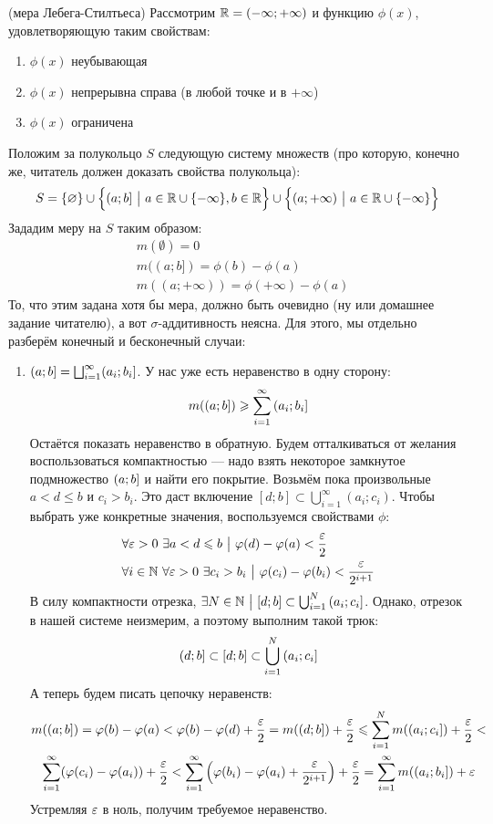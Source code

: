\begin{example} (мера Лебега-Стилтьеса)
	Рассмотрим $\mathbb{R} = (-\infty; +\infty)$ и функцию $\phi(x)$, удовлетворяющую таким свойствам:
	\begin{enumerate}
		\item $\phi(x)$ неубывающая
		
		\item $\phi(x)$ непрерывна справа (в любой точке и в $+\infty$)
		
		\item $\phi(x)$ ограничена
	\end{enumerate}
	Положим за полукольцо $S$ следующую систему множеств (про которую, конечно же, читатель должен доказать свойства полукольца):
	\[
		S = \{\varnothing\} \cup \Big\{(a; b] \ \big|\  a \in \mathbb{R} \cup \{-\infty\}, b \in \mathbb{R}\Big\} \cup \Big\{(a; +\infty) \ \big|\  a \in \mathbb{R} \cup \{-\infty\}\Big\}
	\]
	Зададим меру на $S$ таким образом:
	\begin{align*}
		&{m(\emptyset) = 0}
		\\
		&{m((a; b]) = \phi(b) - \phi(a)}
		\\
		&{m((a; +\infty)) = \phi(+\infty) - \phi(a)}
	\end{align*}
	То, что этим задана хотя бы мера, должно быть очевидно (ну или домашнее задание читателю), а вот $\sigma$-аддитивность неясна. Для этого, мы отдельно разберём конечный и бесконечный случаи:
	\begin{enumerate}
		\item $(a; b] = \bigsqcup_{i = 1}^\infty (a_i; b_i]$. У нас уже есть неравенство в одну сторону:
		\[
			m(\left(a; b\right]) \geqslant \sum_{i = 1}^\infty \left(a_i; b_i\right]
		\]
		Остаётся показать неравенство в обратную. Будем отталкиваться от желания воспользоваться компактностью --- надо взять некоторое замкнутое подмножество $\left(a; b\right]$ и найти его покрытие. Возьмём пока произвольные $a < d \le b$ и $c_i > b_i$. Это даст включение $[d; b] \subset \bigcup_{i = 1}^\infty (a_i; c_i)$. Чтобы выбрать уже конкретные значения, воспользуемся свойствами $\phi$:
		\begin{align*}
			&{\forall \varepsilon > 0\ \exists a < d \leqslant b \ \big|\  \varphi(d) - \varphi(a) < \frac{\varepsilon}{2}}
			\\
			&{\forall i \in \mathbb{N}\ \forall \varepsilon > 0\ \exists c_i > b_i \ \big|\  \varphi(c_i) - \varphi(b_i) < \frac{\varepsilon}{2^{i + 1}}}
		\end{align*}
		В силу компактности отрезка, $\exists N \in \mathbb{N} \ \big|\  [d; b] \subset \bigcup_{i = 1}^N \left(a_i; c_i\right]$. Однако, отрезок в нашей системе неизмерим, а поэтому выполним такой трюк:
		\[
			\left(d; b\right] \subset [d; b] \subset \bigcup_{i = 1}^N \left(a_i; c_i\right]
		\]
		А теперь будем писать цепочку неравенств:
		\begin{multline*}
			m(\left(a; b\right]) = \varphi(b) - \varphi(a) < \varphi(b) - \varphi(d) + \frac{\varepsilon}{2} = m(\left(d; b\right]) + \frac{\varepsilon}{2} \leqslant \sum_{i = 1}^N m(\left(a_i; c_i\right]) + \frac{\varepsilon}{2} <
			\\
			\sum_{i = 1}^\infty (\varphi(c_i) - \varphi(a_i)) + \frac{\varepsilon}{2} < \sum_{i = 1}^\infty \left(\varphi(b_i) - \varphi(a_i) + \frac{\varepsilon}{2^{i + 1}}\right) + \frac{\varepsilon}{2} = \sum_{i = 1}^\infty m(\left(a_i; b_i\right]) + \varepsilon
		\end{multline*}
		Устремляя $\varepsilon$ в ноль, получим требуемое неравенство.
		

\end{enumerate}
\end{example}
